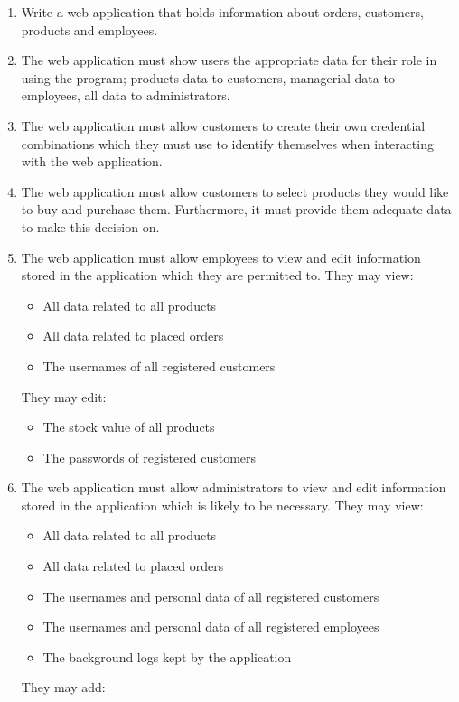 ﻿\documentclass{article}
\begin{document}
    \begin{enumerate}
    \item Write a web application that holds information about orders, customers, products and employees. 
    \item The web application must show users the appropriate data for their role in using the program; products data to customers, managerial data to employees, all data to administrators.
    \item The web application must allow customers to create their own credential combinations which they must use to identify themselves when interacting with the web application.
    \item The web application must allow customers to select products they would like to buy and purchase them. 
    Furthermore, it must provide them adequate data to make this decision on. 
    \item The web application must allow employees to view and edit information stored in the application which they are permitted to. They may view:
    \begin{itemize}
    \item All data related to all products
    \item All data related to placed orders
    \item The usernames of all registered customers
    \end{itemize}
    They may edit: 
    \begin{itemize}
    \item The stock value of all products
    \item The passwords of registered customers
    \end{itemize}
    \item The web application must allow administrators to view and edit information stored in the application which is likely to be necessary. They may view:
    \begin{itemize}
    \item All data related to all products
    \item All data related to placed orders
    \item The usernames and personal data of all registered customers
    \item The usernames and personal data of all registered employees
    \item The background logs kept by the application
    \end{itemize}
    They may add:
    \begin{itemize}

\end{itemize}
\end{enumerate}
\end{document}

